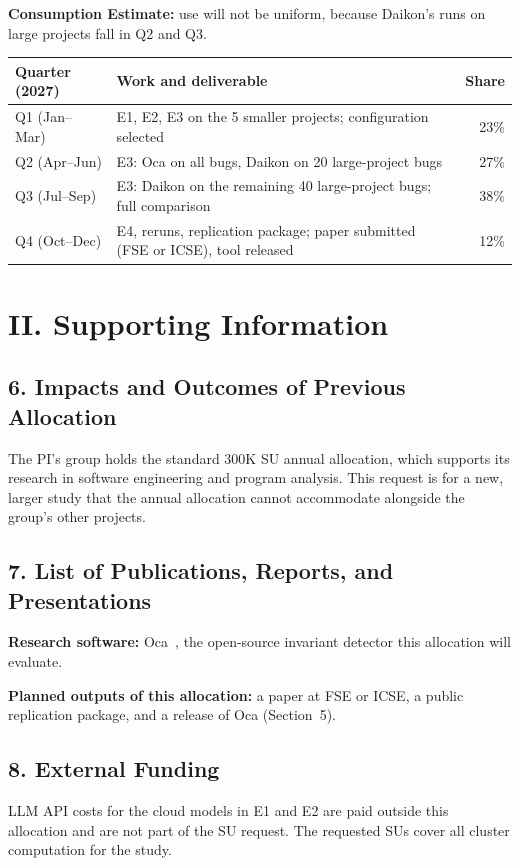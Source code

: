 \documentclass{article}
\begin{document}
\textbf{Consumption Estimate:} use will not be uniform, because Daikon's runs on large projects fall in Q2 and Q3.
\begin{center}
\small
\begin{tabular}{|l|p{11cm}|r|}
\toprule
\textbf{Quarter (2027)} & \textbf{Work and deliverable} & \textbf{Share} \\
\midrule
Q1 (Jan--Mar) & E1, E2, E3 on the 5 smaller projects; configuration selected & 23\% \\
Q2 (Apr--Jun) & E3: Oca on all bugs, Daikon on 20 large-project bugs & 27\% \\
Q3 (Jul--Sep) & E3: Daikon on the remaining 40 large-project bugs; full comparison & 38\% \\
Q4 (Oct--Dec) & E4, reruns, replication package; paper submitted (FSE or ICSE), tool released & 12\% \\
\bottomrule
\end{tabular}
\end{center}


\clearpage

\section*{II. Supporting Information}

\subsection*{6. Impacts and Outcomes of Previous Allocation}
The PI's group holds the standard 300K SU annual allocation, which supports its research in software engineering and program analysis.
This request is for a new, larger study that the annual allocation cannot accommodate alongside the group's other projects.

\subsection*{7. List of Publications, Reports, and Presentations}
\textbf{Research software:} Oca~\cite{Oca}, the open-source invariant detector this allocation will evaluate.

\textbf{Planned outputs of this allocation:} a paper at FSE or ICSE, a public replication package, and a release of Oca (Section~5).

\subsection*{8. External Funding}
LLM API costs for the cloud models in E1 and E2 are paid outside this allocation and are not part of the SU request.
The requested SUs cover all cluster computation for the study.
\end{document}
